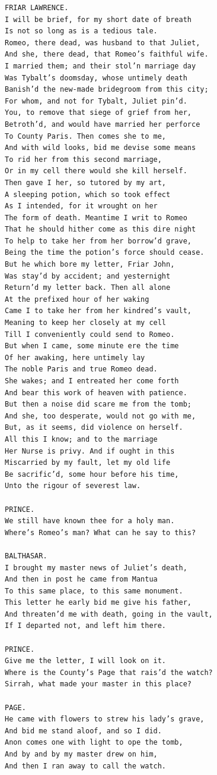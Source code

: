 \documentclass{article}
\begin{document}
\begin{verbatim}
FRIAR LAWRENCE.
I will be brief, for my short date of breath
Is not so long as is a tedious tale.
Romeo, there dead, was husband to that Juliet,
And she, there dead, that Romeo’s faithful wife.
I married them; and their stol’n marriage day
Was Tybalt’s doomsday, whose untimely death
Banish’d the new-made bridegroom from this city;
For whom, and not for Tybalt, Juliet pin’d.
You, to remove that siege of grief from her,
Betroth’d, and would have married her perforce
To County Paris. Then comes she to me,
And with wild looks, bid me devise some means
To rid her from this second marriage,
Or in my cell there would she kill herself.
Then gave I her, so tutored by my art,
A sleeping potion, which so took effect
As I intended, for it wrought on her
The form of death. Meantime I writ to Romeo
That he should hither come as this dire night
To help to take her from her borrow’d grave,
Being the time the potion’s force should cease.
But he which bore my letter, Friar John,
Was stay’d by accident; and yesternight
Return’d my letter back. Then all alone
At the prefixed hour of her waking
Came I to take her from her kindred’s vault,
Meaning to keep her closely at my cell
Till I conveniently could send to Romeo.
But when I came, some minute ere the time
Of her awaking, here untimely lay
The noble Paris and true Romeo dead.
She wakes; and I entreated her come forth
And bear this work of heaven with patience.
But then a noise did scare me from the tomb;
And she, too desperate, would not go with me,
But, as it seems, did violence on herself.
All this I know; and to the marriage
Her Nurse is privy. And if ought in this
Miscarried by my fault, let my old life
Be sacrific’d, some hour before his time,
Unto the rigour of severest law.

PRINCE.
We still have known thee for a holy man.
Where’s Romeo’s man? What can he say to this?

BALTHASAR.
I brought my master news of Juliet’s death,
And then in post he came from Mantua
To this same place, to this same monument.
This letter he early bid me give his father,
And threaten’d me with death, going in the vault,
If I departed not, and left him there.

PRINCE.
Give me the letter, I will look on it.
Where is the County’s Page that rais’d the watch?
Sirrah, what made your master in this place?

PAGE.
He came with flowers to strew his lady’s grave,
And bid me stand aloof, and so I did.
Anon comes one with light to ope the tomb,
And by and by my master drew on him,
And then I ran away to call the watch.


\end{verbatim}
\end{document}
